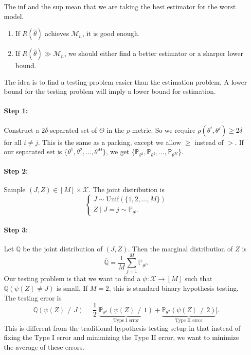 The inf and the sup mean that we are taking the best estimator for the worst model.
\begin{enumerate}
    \item[(a)] If $R(\widehat{\theta})$ achieves $\mathcal{M}_n$, it is good enough.
    \item[(b)] If $R(\widehat{\theta}) \gg \mathcal{M}_n$, we should either find a better estimator or a sharper lower bound.
\end{enumerate}


The idea is to find a testing problem easier than the estimation problem. A lower bound for the testing problem will imply a lower bound for estimation.

\paragraph{Step 1:} Construct a $2\delta$-separated set of $\Theta$ in the $\rho$-metric.
So we require $\rho(\theta^i, \theta^j) \geq 2\delta$ for all $i \neq j$. This is the same as a packing, except we allow $\geq$ instead of $>$. If our separated set is $\{\theta^1, \theta^2, \ldots, \theta^M\}$, we get $\{\mathbb{P}_{\theta^1}, \mathbb{P}_{\theta^2}, \ldots, \mathbb{P}_{\theta^M}\}$.

\paragraph{Step 2:} Sample $(J, Z) \in [M] \times \mathcal{X}$. The joint distribution is
\begin{equation*}
    \begin{cases}
        J \sim \mathrm{Unif}(\{1, 2, \ldots, M\}) \\
        Z \mid J = j \sim \mathbb{P}_{\theta^j}.
    \end{cases}
\end{equation*}

\paragraph{Step 3:} Let $\mathbb{Q}$ be the joint distribution of $(J, Z)$. Then the marginal distribution of $Z$ is
\begin{equation*}
    \overline{\mathbb{Q}} = \frac{1}{M} \sum_{j=1}^{M} \mathbb{P}_{\theta^j}.
\end{equation*}
Our testing problem is that we want to find a $\psi : \mathcal{X} \to [M]$ such that $\mathbb{Q}(\psi(Z) \neq J)$ is small. If $M = 2$, this is standard binary hypothesis testing. The testing error is
\begin{equation*}
    \mathbb{Q}(\psi(Z) \neq J) = \frac{1}{2} \big[ \underbrace{\mathbb{P}_{\theta^1}(\psi(Z) \neq 1)}_{\text{Type I error}} + \underbrace{\mathbb{P}_{\theta^2}(\psi(Z) \neq 2)}_{\text{Type II error}} \big].
\end{equation*}
This is different from the traditional hypothesis testing setup in that instead of fixing the Type I error and minimizing the Type II error, we want to minimize the average of these errors.

